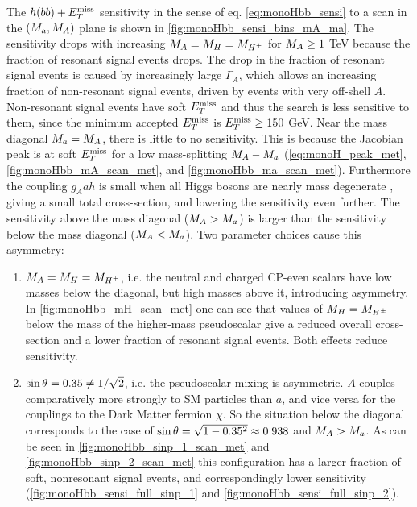 The $h(bb)+E_T^\mathrm{miss}$ sensitivity in the sense of eq. \ref{eq:monoHbb_sensi} to a scan in the $(M_{a},M_{A})$ plane is shown in  \autoref{fig:monoHbb_sensi_bins_mA_ma}.
The sensitivity drops with increasing $M_{A} = M_{H} = M_{H^{\pm}}$ for $M_{A} \geq 1 $ TeV because the fraction of resonant signal events drops. 
The drop in the fraction of resonant signal events is caused by increasingly large $\Gamma_A$, 
which allows an increasing fraction of non-resonant signal events, driven by events with very off-shell $A$. %
Non-resonant signal events have soft $E_T^\mathrm{miss}$ and thus the search is less sensitive to them, since the minimum accepted $E_T^\mathrm{miss}$ is $E_T^\mathrm{miss} \geq 150$ GeV.
Near the mass diagonal $M_{a} = M_{A}$, there is little to no sensitivity. 
This is because the Jacobian peak is at soft $E_T^\mathrm{miss}$ for a low mass-splitting $M_{A} - M_{a}$
(\autoref{eq:monoH_peak_met}, \autoref{fig:monoHbb_mA_scan_met}, and \autoref{fig:monoHbb_ma_scan_met}).
Furthermore the coupling $g_Aah$ is small when all Higgs bosons are nearly mass degenerate \cite{Bauer:2017ota}, %
giving a small total cross-section, and lowering the sensitivity even further.
The sensitivity above the mass diagonal ($M_{A} > M_{a}$) is larger than the sensitivity below the mass diagonal ($M_{A} < M_{a}$).
Two parameter choices cause this asymmetry:
\begin{enumerate}
\item $M_{A} = M_{H} = M_{H^{\pm}}$, i.e. the neutral and charged CP-even scalars have low masses below the diagonal, but high masses above it, introducing asymmetry.
In \autoref{fig:monoHbb_mH_scan_met} one can see that values of  $M_{H} = M_{H^{\pm}}$ below the mass of the higher-mass pseudoscalar 
give a reduced overall cross-section and a lower fraction of resonant signal events. Both effects reduce sensitivity.
\item $\sin\theta = 0.35 \neq 1/\sqrt{2}$, i.e. the pseudoscalar mixing is asymmetric. 
$A$ couples comparatively more strongly to SM particles than $a$, and vice versa for the  couplings to the Dark Matter fermion $\chi$.
So the situation below the diagonal corresponds to the case of $\sin\theta = \sqrt{1-0.35^2} \approx 0.938$ and $M_{A} > M_{a}$. 
As can be seen in \autoref{fig:monoHbb_sinp_1_scan_met} and \autoref{fig:monoHbb_sinp_2_scan_met} %
this configuration has a larger fraction of  soft, nonresonant signal events, and correspondingly lower sensitivity 
(\autoref{fig:monoHbb_sensi_full_sinp_1} and \autoref{fig:monoHbb_sensi_full_sinp_2}).
\end{enumerate}

